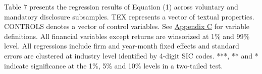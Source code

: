 \begin{table}[H]
\begin{footnotesize}
			\noindent Table 7 presents the regression results of Equation (1) across voluntary and mandatory disclosure subsamples. TEX represents a vector of textual properties. CONTROLS denotes a vector of control variables. See \hyperref[appc]{Appendix C} for variable definitions. All financial variables except returns are winsorized at 1\% and 99\% level. All regressions include firm and year-month fixed effects and standard errors are clustered at industry level identified by 4-digit SIC codes. ***, ** and * indicate significance at the 1\%, 5\% and 10\% levels in a two-tailed test.
		\end{footnotesize}
\end{table}%